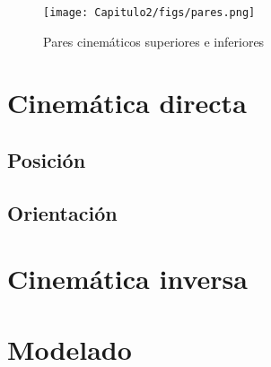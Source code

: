 \begin{figure}
	\centering
	\texttt{[image: Capitulo2/figs/pares.png]} 
	\caption{Pares cinemáticos superiores e inferiores}
	\label{pares}
\end{figure}

\section{Cinemática directa}

\subsection{Posición}

\subsection{Orientación}

\section{Cinemática inversa}

\section{Modelado}

\begin{lstlisting}[frame=single]
    % Declaracion de las variables simbolicas
\end{lstlisting}
